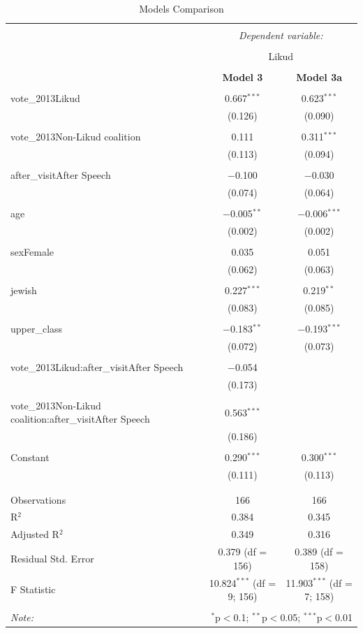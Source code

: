 \documentclass[12pt,letterpaper]{article}
\begin{document}
	\vspace{0.2cm}
\begin{table}[!htbp] \centering   \caption{Models Comparison}   \label{} \begin{tabular}{@{\extracolsep{5pt}}lcc} \\[-1.8ex]\hline \hline \\[-1.8ex]  & \multicolumn{2}{c}{\textit{Dependent variable:}} \\ \cline{2-3} \\[-1.8ex] & \multicolumn{2}{c}{Likud} \\ \\[-1.8ex] & \textbf{Model 3} & \textbf{Model 3a}\\ \hline \\[-1.8ex]  vote\_2013Likud & 0.667$^{***}$ & 0.623$^{***}$ \\   & (0.126) & (0.090) \\   & & \\  vote\_2013Non-Likud coalition & 0.111 & 0.311$^{***}$ \\   & (0.113) & (0.094) \\   & & \\  after\_visitAfter Speech & $-$0.100 & $-$0.030 \\   & (0.074) & (0.064) \\   & & \\  age & $-$0.005$^{**}$ & $-$0.006$^{***}$ \\   & (0.002) & (0.002) \\   & & \\  sexFemale & 0.035 & 0.051 \\   & (0.062) & (0.063) \\   & & \\  jewish & 0.227$^{***}$ & 0.219$^{**}$ \\   & (0.083) & (0.085) \\   & & \\  upper\_class & $-$0.183$^{**}$ & $-$0.193$^{***}$ \\   & (0.072) & (0.073) \\   & & \\  vote\_2013Likud:after\_visitAfter Speech & $-$0.054 &  \\   & (0.173) &  \\   & & \\  vote\_2013Non-Likud coalition:after\_visitAfter Speech & 0.563$^{***}$ &  \\   & (0.186) &  \\   & & \\  Constant & 0.290$^{***}$ & 0.300$^{***}$ \\   & (0.111) & (0.113) \\   & & \\ \hline \\[-1.8ex] Observations & 166 & 166 \\ R$^{2}$ & 0.384 & 0.345 \\ Adjusted R$^{2}$ & 0.349 & 0.316 \\ Residual Std. Error & 0.379 (df = 156) & 0.389 (df = 158) \\ F Statistic & 10.824$^{***}$ (df = 9; 156) & 11.903$^{***}$ (df = 7; 158) \\ \hline \hline \\[-1.8ex] \textit{Note:}  & \multicolumn{2}{r}{$^{*}$p$<$0.1; $^{**}$p$<$0.05; $^{***}$p$<$0.01} \\ \end{tabular} \end{table} 
	
\end{document}
